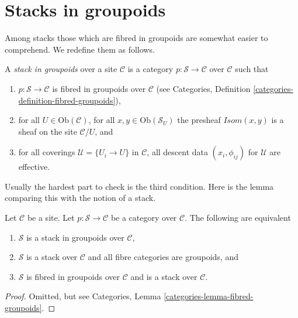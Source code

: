 \section{Stacks in groupoids}
\label{section-stacks-in-groupoids}

\noindent
Among stacks those which are fibred in groupoids are somewhat easier
to comprehend. We redefine them as follows.

\begin{definition}
\label{definition-stack-in-groupoids}
A {\it stack in groupoids} over a site $\mathcal{C}$ is a
category $p : \mathcal{S} \to \mathcal{C}$ over $\mathcal{C}$
such that
\begin{enumerate}
\item $p : \mathcal{S} \to \mathcal{C}$ is fibred
in groupoids over $\mathcal{C}$ (see
Categories, Definition \ref{categories-definition-fibred-groupoids}),
\item for all $U \in \text{Ob}(\mathcal{C})$,
for all $x, y\in \text{Ob}(\mathcal{S}_U)$ the presheaf
$\mathit{Isom}(x, y)$ is a sheaf on the site $\mathcal{C}/U$, and
\item for all coverings $\mathcal{U} = \{U_i \to U\}$ in $\mathcal{C}$,
all descent data $(x_i, \phi_{ij})$ for $\mathcal{U}$ are effective.
\end{enumerate}
\end{definition}

\noindent
Usually the hardest part to check is the third condition.
Here is the lemma comparing this with the notion of a stack.

\begin{lemma}
\label{lemma-stack-in-groupoids-stack}
Let $\mathcal{C}$ be a site.
Let $p : \mathcal{S} \to \mathcal{C}$ be a category over $\mathcal{C}$.
The following are equivalent
\begin{enumerate}
\item $\mathcal{S}$ is a stack in groupoids over $\mathcal{C}$,
\item $\mathcal{S}$ is a stack over $\mathcal{C}$ and all
fibre categories are groupoids, and
\item $\mathcal{S}$ is fibred in groupoids over $\mathcal{C}$
and is a stack over $\mathcal{C}$.
\end{enumerate}
\end{lemma}

\begin{proof}
Omitted, but see Categories, Lemma \ref{categories-lemma-fibred-groupoids}.
\end{proof}

